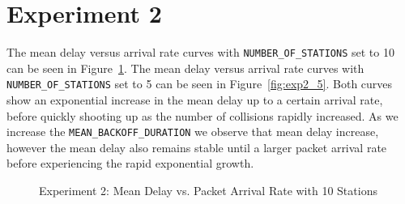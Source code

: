 \section*{Experiment 2}
The mean delay versus arrival rate curves with \texttt{NUMBER\_OF\_STATIONS} set to 10 can be seen in Figure~\ref{fig:exp2_10}. The mean delay versus arrival rate curves with \texttt{NUMBER\_OF\_STATIONS} set to 5 can be seen in Figure~\ref{fig:exp2_5}. Both curves show an exponential increase in the mean delay up to a certain arrival rate, before quickly shooting up as the number of collisions rapidly increased. As we increase the \texttt{MEAN\_BACKOFF\_DURATION} we observe that mean delay increase, however the mean delay also remains stable until a larger packet arrival rate before experiencing the rapid exponential growth.

\begin{figure}[htp]
\centering
{}
\caption{Experiment 2: Mean Delay vs. Packet Arrival Rate with 10 Stations}
\label{fig:exp2_10}
\end{figure}

